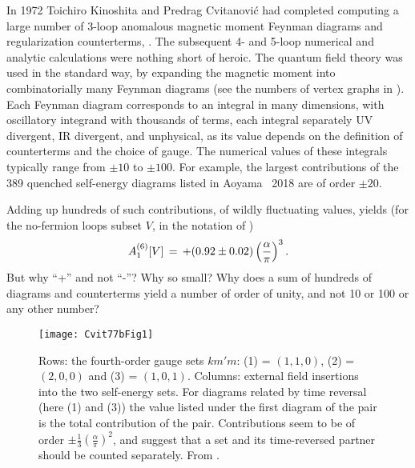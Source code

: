 \noindent
In 1972 Toichiro Kinoshita and Predrag Cvitanovi\'c had completed
computing a large number of 3-loop anomalous magnetic moment Feynman
diagrams and regularization counterterms,
.
The subsequent 4- and 5-loop numerical and analytic calculations were
nothing short of heroic. The
quantum field theory was used in the standard way, by
expanding the magnetic moment into combinatorially many Feynman diagrams
(see the numbers of vertex graphs in ).
Each Feynman diagram corresponds to an integral in many dimensions, with
oscillatory integrand with thousands of terms, each integral separately
UV divergent, IR divergent, and unphysical, as its value depends on the
definition of counterterms and the choice of gauge.
The numerical values of these integrals typically range from  $\pm 10$
to $\pm 100$. For example, the largest contributions of
the 389 quenched self-energy diagrams listed in
Aoyama \etal\ 2018 are of order $\pm 20$.

Adding up hundreds of such contributions, of wildly fluctuating values,
yields (for the no-fermion loops subset $V$, in the notation of
)
\[
 A_1^{(6)}[V]\,=\, +  (0.92 \pm 0.02) \left(\frac{\alpha}{\pi}\right)^3.
\]
But why ``+'' and not ``-''? Why so small? Why does a sum of hundreds of
diagrams and counterterms yield a number of order of unity, and not 10 or
100 or any other number?

\begin{figure}
\begin{center}
\texttt{[image: Cvit77bFig1]}
\end{center}
\caption{\label{Cvit77bFig1}
Rows: the fourth-order gauge sets
$km'm$: (1) = $(1,1,0)$,
(2) = $(2,0,0)$
and
(3) = $(1,0,1)$.
Columns: external field insertions into the two self-energy sets.
For diagrams related by time
reversal (here (1) and (3))
the value listed under the first diagram of the pair is
the total contribution of the pair. Contributions seem to be of order
$\pm\frac{1}{3}\left(\frac{\alpha}{\pi}\right)^2$, and suggest that
a set and its time-reversed partner should be counted separately.
From .
}
 \end{figure}

